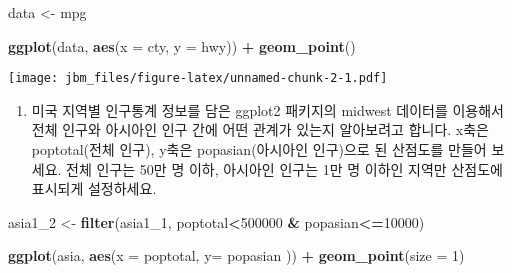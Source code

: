 \documentclass[]{article}
\newenvironment{Shaded}{\begin{snugshade}}{\end{snugshade}}
\newcommand{\DataTypeTok}[1]{\textcolor[rgb]{0.13,0.29,0.53}{#1}}
\newcommand{\DecValTok}[1]{\textcolor[rgb]{0.00,0.00,0.81}{#1}}
\newcommand{\KeywordTok}[1]{\textcolor[rgb]{0.13,0.29,0.53}{\textbf{#1}}}
\newcommand{\NormalTok}[1]{#1}
\newcommand{\OperatorTok}[1]{\textcolor[rgb]{0.81,0.36,0.00}{\textbf{#1}}}
\newcommand{\StringTok}[1]{\textcolor[rgb]{0.31,0.60,0.02}{#1}}
\providecommand{\tightlist}{%
  \setlength{\itemsep}{0pt}\setlength{\parskip}{0pt}}
\begin{document}
\begin{Shaded}
\begin{Highlighting}[]
\NormalTok{data <-}\StringTok{ }\NormalTok{mpg}

\KeywordTok{ggplot}\NormalTok{(data, }\KeywordTok{aes}\NormalTok{(}\DataTypeTok{x =}\NormalTok{ cty, }\DataTypeTok{y =}\NormalTok{ hwy)) }\OperatorTok{+}
\StringTok{  }\KeywordTok{geom_point}\NormalTok{()}
\end{Highlighting}
\end{Shaded}

\texttt{[image: jbm\_files/figure-latex/unnamed-chunk-2-1.pdf]}

\begin{Shaded}
\end{Shaded}

\begin{enumerate}
\def\labelenumi{\arabic{enumi}.}
\setcounter{enumi}{1}
\tightlist
\item
  미국 지역별 인구통계 정보를 담은 ggplot2 패키지의 midwest 데이터를
  이용해서 전체 인구와 아시아인 인구 간에 어떤 관계가 있는지 알아보려고
  합니다. x축은 poptotal(전체 인구), y축은 popasian(아시아인 인구)으로
  된 산점도를 만들어 보세요. 전체 인구는 50만 명 이하, 아시아인 인구는
  1만 명 이하인 지역만 산점도에 표시되게 설정하세요.
\end{enumerate}

\begin{Shaded}
\begin{Highlighting}[]
\NormalTok{asia1_}\DecValTok{2}\NormalTok{ <-}\StringTok{ }\KeywordTok{filter}\NormalTok{(asia1_}\DecValTok{1}\NormalTok{, poptotal}\OperatorTok{<}\DecValTok{500000} \OperatorTok{&}\StringTok{ }\NormalTok{popasian}\OperatorTok{<=}\DecValTok{10000}\NormalTok{)}

\KeywordTok{ggplot}\NormalTok{(asia, }\KeywordTok{aes}\NormalTok{(}\DataTypeTok{x =}\NormalTok{ poptotal, }\DataTypeTok{y=}\NormalTok{ popasian )) }\OperatorTok{+}
\StringTok{  }\KeywordTok{geom_point}\NormalTok{(}\DataTypeTok{size =} \DecValTok{1}\NormalTok{)}
\end{Highlighting}
\end{Shaded}
\end{document}
